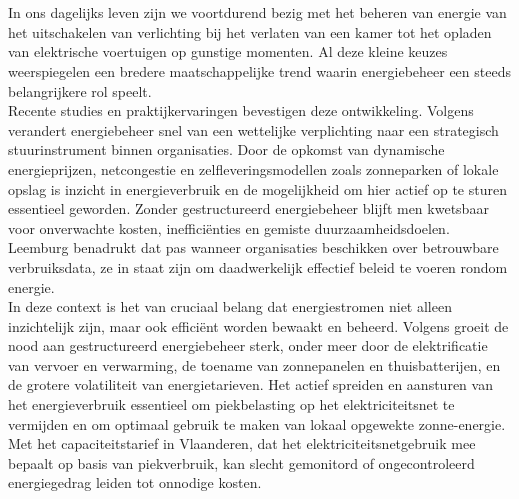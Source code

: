 
\chapter{}%
\label{ch:inleiding}

\noindent
In ons dagelijks leven zijn we voortdurend bezig met het beheren van energie van het uitschakelen van verlichting bij het verlaten van een kamer tot het opladen van elektrische voertuigen op gunstige momenten. Al deze kleine keuzes weerspiegelen een bredere maatschappelijke trend waarin energiebeheer een steeds belangrijkere rol speelt. \\

Recente studies en praktijkervaringen bevestigen deze ontwikkeling. Volgens \autocite{Leemburg2025} verandert energiebeheer snel van een wettelijke verplichting naar een strategisch stuurinstrument binnen organisaties. Door de opkomst van dynamische energieprijzen, netcongestie en zelfleveringsmodellen zoals zonneparken of lokale opslag is inzicht in energieverbruik en de mogelijkheid om hier actief op te sturen essentieel geworden. Zonder gestructureerd energiebeheer blijft men kwetsbaar voor onverwachte kosten, inefficiënties en gemiste duurzaamheidsdoelen. Leemburg benadrukt dat pas wanneer organisaties beschikken over betrouwbare verbruiksdata, ze in staat zijn om daadwerkelijk effectief beleid te voeren rondom energie.\\

\noindent
In deze context is het van cruciaal belang dat energiestromen niet alleen inzichtelijk zijn, maar ook efficiënt worden bewaakt en beheerd. Volgens \autocite{Selleslagh} groeit de nood aan gestructureerd energiebeheer sterk, onder meer door de elektrificatie van vervoer en verwarming, de toename van zonnepanelen en thuisbatterijen, en de grotere volatiliteit van energietarieven. 
Het actief spreiden en aansturen van het energieverbruik essentieel om piekbelasting op het elektriciteitsnet te vermijden en om optimaal gebruik te maken van lokaal opgewekte zonne-energie. Met het capaciteitstarief in Vlaanderen, dat het elektriciteitsnetgebruik mee bepaalt op basis van piekverbruik, kan slecht gemonitord of ongecontroleerd energiegedrag leiden tot onnodige kosten. \\

